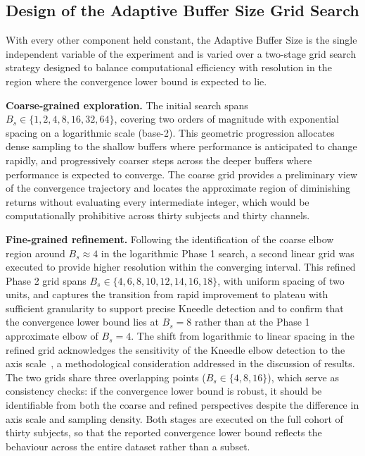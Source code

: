 \documentclass[MScCS,12pt,oneside,final]{uccthesis}
\begin{document}
\subsection{Design of the Adaptive Buffer Size Grid Search}
\label{subsec:design_grid_search}

With every other component held constant, the Adaptive Buffer Size is the single independent variable of the experiment and is varied over a two-stage grid search strategy designed to balance computational efficiency with resolution in the region where the convergence lower bound is expected to lie.

\textbf{Coarse-grained exploration.} The initial search spans $B_s \in \{1, 2, 4, 8, 16, 32, 64\}$, covering two orders of magnitude with exponential spacing on a logarithmic scale (base-2). This geometric progression allocates dense sampling to the shallow buffers where performance is anticipated to change rapidly, and progressively coarser steps across the deeper buffers where performance is expected to converge. The coarse grid provides a preliminary view of the convergence trajectory and locates the approximate region of diminishing returns without evaluating every intermediate integer, which would be computationally prohibitive across thirty subjects and thirty channels.

\textbf{Fine-grained refinement.} Following the identification of the coarse elbow region around $B_s \approx 4$ in the logarithmic Phase 1 search, a second linear grid was executed to provide higher resolution within the converging interval. This refined Phase 2 grid spans $B_s \in \{4, 6, 8, 10, 12, 14, 16, 18\}$, with uniform spacing of two units, and captures the transition from rapid improvement to plateau with sufficient granularity to support precise Kneedle detection and to confirm that the convergence lower bound lies at $B_s = 8$ rather than at the Phase 1 approximate elbow of $B_s = 4$. The shift from logarithmic to linear spacing in the refined grid acknowledges the sensitivity of the Kneedle elbow detection to the axis scale~\parencite{satopaa2011finding}, a methodological consideration addressed in the discussion of results. The two grids share three overlapping points ($B_s \in \{4,8,16\}$), which serve as consistency checks: if the convergence lower bound is robust, it should be identifiable from both the coarse and refined perspectives despite the difference in axis scale and sampling density. Both stages are executed on the full cohort of thirty subjects, so that the reported convergence lower bound reflects the behaviour across the entire dataset rather than a subset.
\end{document}
